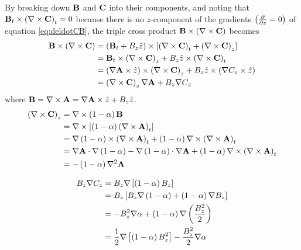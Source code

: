 \noindent By breaking down $\mathbf{B}$ and $\mathbf{C}$ into their components, and noting that $\mathbf{B}_t \times \left( \nabla \times\mathbf{C} \right)_t =0$ because there is no $z$-component of the gradients $\left( \frac{\partial}{\partial z}=0 \right)$ of equation \ref{eq:deldotCB}, the triple cross product $\mathbf{B}\times\left( \nabla \times\mathbf{C} \right)$ becomes
\begin{equation}
    \begin{split}
        \mathbf{B}\times\left( \nabla \times\mathbf{C} \right) &= \left( \mathbf{B}_t + B_z\hat{z} \right)\times\left[ \left( \nabla \times\mathbf{C} \right)_t + \left( \nabla \times\mathbf{C} \right)_z \right] \\
        &= \mathbf{B}_t\times \left( \nabla \times\mathbf{C} \right)_z + B_z\hat{z}\times\left( \nabla \times\mathbf{C} \right)_t \\
        &= \left( \nabla\mathbf{A}\times\hat{z} \right)\times \left( \nabla \times\mathbf{C} \right)_z + B_z\hat{z} \times \left( \nabla C_z\times\hat{z} \right) \\
        &= \left( \nabla \times\mathbf{C} \right)_z\nabla\mathbf{A} +  B_z\nabla C_z \\
    \end{split}
\end{equation}
where $\mathbf{B} = \nabla \times\mathbf{A} = \nabla\mathbf{A}\times\hat{z} + B_z\hat{z}$.
\begin{equation}
    \begin{split}
        \left( \nabla \times\mathbf{C} \right)_z &= \nabla \times\left( 1-\alpha \right)\mathbf{B} \\
        &= \nabla \times\left[ \left( 1-\alpha \right)\left( \nabla \times\mathbf{A} \right)_t \right] \\
        &= \nabla\left( 1-\alpha \right)\times\left( \nabla \times\mathbf{A} \right)_t + \left( 1-\alpha \right)\nabla \times \left( \nabla \times\mathbf{A} \right)_t \\
        &= \nabla\mathbf{A}\cdot\nabla\left( 1-\alpha \right) - \nabla\left( 1-\alpha \right)\cdot\nabla\mathbf{A} + \left( 1-\alpha \right)\nabla \times \left( \nabla \times\mathbf{A} \right)_t \\
        &= -\left( 1-\alpha \right)\nabla^2\mathbf{A} \\
    \end{split}
\end{equation}

\begin{equation}
    \begin{split}
        B_z\nabla C_z &= B_z\nabla\left[ \left( 1-\alpha \right)B_z \right] \\
        &= B_z\left[ B_z\nabla\left( 1-\alpha \right) + \left( 1-\alpha \right)\nabla B_z \right] \\
        &= -B_z^2\nabla\alpha + \left( 1-\alpha \right)\nabla\left( \frac{B_z^2}{2} \right) \\
        &= \frac{1}{2}\nabla\left[ \left( 1-\alpha \right)B_z^2 \right] - \frac{B_z^2}{2}\nabla\alpha
    \end{split}
\end{equation}

